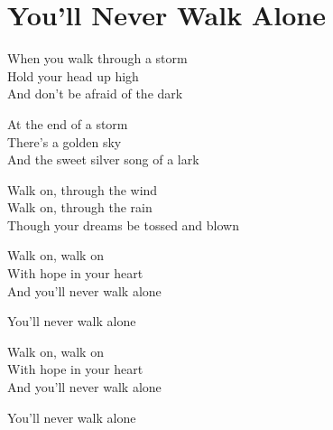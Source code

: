 \section{You'll Never Walk Alone}
When you walk through a storm\\
Hold your head up high\\
And don't be afraid of the dark

At the end of a storm\\
There's a golden sky\\
And the sweet silver song of a lark

Walk on, through the wind\\
Walk on, through the rain\\
Though your dreams be tossed and blown

Walk on, walk on\\
With hope in your heart\\
And you'll never walk alone

You'll never walk alone

Walk on, walk on\\
With hope in your heart\\
And you'll never walk alone

You'll never walk alone
